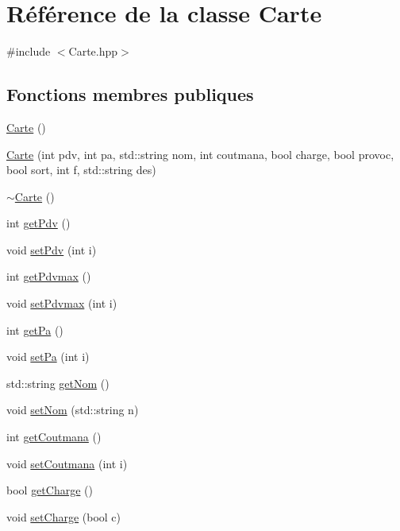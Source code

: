 \hypertarget{class_carte}{\section{Référence de la classe Carte}
\label{class_carte}
}


{\ttfamily \#include $<$Carte.\-hpp$>$}

\subsection*{Fonctions membres publiques}
\begin{DoxyCompactItemize}
\item 
\hyperlink{class_carte_a06daaca86c31c80f8308f4a81d46dc9b}{Carte} ()
\item 
\hyperlink{class_carte_aa9dbe7013e77d06af96ed4e4e0c4d551}{Carte} (int pdv, int pa, std\-::string nom, int coutmana, bool charge, bool provoc, bool sort, int f, std\-::string des)
\item 
\hyperlink{class_carte_a63300ff55c58b5d5b1674a3fc8f25910}{$\sim$\-Carte} ()
\item 
int \hyperlink{class_carte_a657918ef04b48d042985550cc9531b96}{get\-Pdv} ()
\item 
void \hyperlink{class_carte_a002eabf379874c8a989d0ee4469074d0}{set\-Pdv} (int i)
\item 
int \hyperlink{class_carte_a3d71e111f10666ca64f94c48ca2f215f}{get\-Pdvmax} ()
\item 
void \hyperlink{class_carte_aa997fa354a645b125491589dbc4631d1}{set\-Pdvmax} (int i)
\item 
int \hyperlink{class_carte_a581e595258304eb2ca44dbcf24fade5b}{get\-Pa} ()
\item 
void \hyperlink{class_carte_ab84e1045db524abd89c715ce8c9e57eb}{set\-Pa} (int i)
\item 
std\-::string \hyperlink{class_carte_a3650c2d0ea9877fe29f4673f430daa8e}{get\-Nom} ()
\item 
void \hyperlink{class_carte_a09ba2c6fba7ce1780e3bfa52f7adb13a}{set\-Nom} (std\-::string n)
\item 
int \hyperlink{class_carte_a7af45415441059ab3f3696d3ef711c6a}{get\-Coutmana} ()
\item 
void \hyperlink{class_carte_a7965f40ee312b74c9e65601156c8a1b9}{set\-Coutmana} (int i)
\item 
bool \hyperlink{class_carte_aba4e16959b49ba9c7673c6c3ac848da4}{get\-Charge} ()
\item 
void \hyperlink{class_carte_aa432c0b924d602dd602dbec76a2a05fd}{set\-Charge} (bool c)

\end{DoxyCompactItemize}
